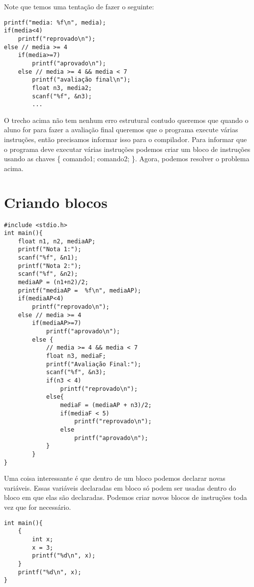 \documentclass[a4paper,11pt]{article}
\begin{document}
Note que temos uma tentação de fazer o seguinte:

\begin{verbatim}
printf("media: %f\n", media);
if(media<4) 
    printf("reprovado\n");
else // media >= 4
    if(media>=7)
        printf("aprovado\n");
    else // media >= 4 && media < 7
        printf("avaliação final\n");
        float n3, media2;
        scanf("%f", &n3);
        ...
\end{verbatim}

O trecho acima não tem nenhum erro estrutural contudo queremos que quando o aluno for para fazer a avaliação final queremos que o programa execute várias instruções, então precisamos informar isso para o compilador. Para informar que o programa deve executar várias instruções podemos criar um bloco de instruções usando as chaves \{ comando1; comando2; \}. Agora, podemos resolver o problema acima.


\section*{Criando blocos}

\begin{verbatim}
#include <stdio.h>
int main(){
	float n1, n2, mediaAP;	
	printf("Nota 1:");
	scanf("%f", &n1);
	printf("Nota 2:");
	scanf("%f", &n2);
	mediaAP = (n1+n2)/2;
	printf("mediaAP =  %f\n", mediaAP);
	if(mediaAP<4) 
		printf("reprovado\n");
	else // media >= 4
		if(mediaAP>=7)
			printf("aprovado\n");
		else { 
			// media >= 4 && media < 7
			float n3, mediaF;
			printf("Avaliação Final:");
			scanf("%f", &n3);
			if(n3 < 4)
				printf("reprovado\n");
			else{
				mediaF = (mediaAP + n3)/2;
				if(mediaF < 5)
					printf("reprovado\n");
				else
					printf("aprovado\n");
			}
		}	
}
\end{verbatim}

Uma coisa interessante é que dentro de um bloco podemos declarar novas variáveis. Essas variáveis declaradas em bloco só podem ser usadas dentro do bloco em que elas são declaradas. Podemos criar novos blocos de instruções toda vez que for necessário.

\begin{verbatim}
int main(){
    {
        int x;
        x = 3;
        printf("%d\n", x); 
    }
    printf("%d\n", x);
}
\end{verbatim}
\end{document}
